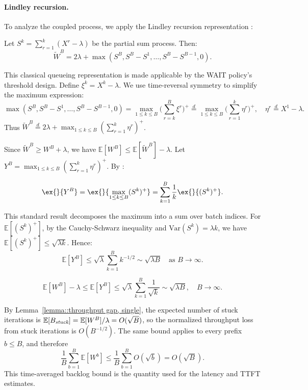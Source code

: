 \paragraph{Lindley recursion.} To analyze the coupled process, we apply the Lindley recursion representation \citep[Proposition 6.3]{asmussen2003applied}:
\begin{lemma}\label{lem:lindley_rep}
Let $S^k=\sum_{r=1}^k (X^r-\lambda)$ be the partial sum process. Then:
$$\tilde{W}^B=2\lambda+\max(S^B, S^B-S^1,\ldots,S^B-S^{B-1},0).$$
\end{lemma}
\noindent This classical queueing representation is made applicable by the WAIT policy's threshold design. Define $\xi^k = X^k-\lambda$. We use time-reversal symmetry to simplify the maximum expression:
$$\max(S^B, S^B-S^1,\ldots,S^B-S^{B-1},0)=\max_{1\leq k\leq B}\Big(\sum_{r=k}^{B}\xi^r\Big)^+\overset{d}{=}\max_{1\leq k\leq B}\Big(\sum_{r=1}^{k}\eta^r\Big)^+, \quad \eta^r\overset{d}{=}X^1-\lambda.$$
Thus $\tilde{W}^B \overset{d}{=}2\lambda+\max_{1\leq k\leq B}(\sum_{r=1}^{k}\eta^r)^+$.

Since $\tilde{W}^B \geq W^B + \lambda$, we have $\mathbb{E}[W^B]\leq \mathbb{E}[\tilde{W}^B]-\lambda$. Let $Y^B = \max_{1\leq k\leq B}(\sum_{r=1}^{k}\eta^r)^+$. By \cite[Lemma 2]{strait1974maximum}:
\begin{lemma}\label{lem:Y_T}
$$\ex{}{Y^B}=\ex{}{\max_{1\leq k\leq B}(S^k)^+}=\sum_{k=1}^B \frac{1}{k}\ex{}{(S^k)^+}.$$
\end{lemma}
\noindent This standard result \citep{strait1974maximum} decomposes the maximum into a sum over batch indices. For $\mathbb{E}[(S^k)^+]$, by the Cauchy-Schwarz inequality and $\text{Var}(S^k) = \lambda k$, we have $\mathbb{E}[(S^k)^+] \leq \sqrt{\lambda k}$. Hence:
$$\mathbb{E}[Y^B] \leq \sqrt{\lambda} \sum_{k=1}^B k^{-1/2} \sim \sqrt{\lambda B} \quad \text{as } B \to \infty.$$

\begin{lemma}\label{lemma::throughput gap}
$$\mathbb{E}[W^B]-\lambda\leq \mathbb{E}[Y^B]\leq  \sqrt{\lambda} \sum_{k=1}^B \frac{1}{\sqrt{k}} \sim\sqrt{\lambda B},\quad B\to \infty.$$
\end{lemma}
\noindent By Lemma~\ref{lemma::throughput gap, single}, the expected number of stuck iterations is $\mathbb{E}[B_{\emph{stuck}}]=\mathbb{E}[W^B]/\lambda=O(\sqrt{B})$, so the normalized throughput loss from stuck iterations is $O(B^{-1/2})$. The same bound applies to every prefix \(b\le B\), and therefore
\[
    \frac{1}{B}\sum_{b=1}^B \mathbb{E}[W^b] \leq \frac{1}{B}\sum_{b=1}^B O(\sqrt{b}) = O(\sqrt{B}).
\]
This time-averaged backlog bound is the quantity used for the latency and TTFT estimates.

